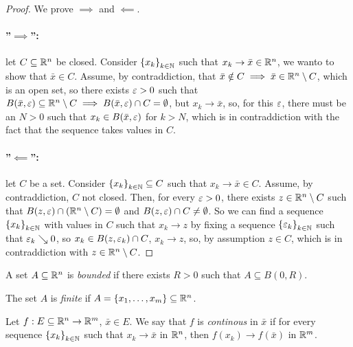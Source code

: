 \begin{proof}
    
    We prove $\implies$ and $\impliedby$.

    \paragraph{''$\implies$'':} let $C \subseteq {\mathbb{R}^n}$ be closed. Consider $\left\{ x_k \right\}_{k \in \mathbb{N}}$ such that $x_k \to \bar{x} \in {\mathbb{R}^n}$, we wanto to show that $\bar{x} \in C$. Assume, by contraddiction, that $\bar{x} \notin C \implies \bar{x} \in {\mathbb{R}^n} \setminus C$, which is an open set, so there exists $\varepsilon > 0$ such that $B(\bar{x},\varepsilon) \subseteq {\mathbb{R}^n}\setminus C \implies B(\bar{x},\varepsilon) \cap C = \emptyset$, but $x_k \to \bar{x}$, so, for this $\varepsilon$, there must be an $N > 0$ such that $x_k \in B(\bar{x},\varepsilon)$ for $k > N$, which is in contraddiction with the fact that the sequence takes values in $C$.

    \paragraph{''$\impliedby$'':} let $C$ be a set. Consider $\left\{ x_k \right\}_{k \in \mathbb{N}}\subseteq C$ such that $x_k \to \bar{x} \in C$. Assume, by contraddiction, $C$ not closed. Then, for every $\varepsilon > 0$, there exists $z \in {\mathbb{R}^n} \setminus C$ such that $B(z,\varepsilon) \cap ({\mathbb{R}^n} \setminus C) = \emptyset$ and $B(z,\varepsilon) \cap C \neq \emptyset$. So we can find a sequence $\left\{ x_k \right\}_{k \in \mathbb{N}}$ with values in $C$ such that $x_k \to z$ by fixing a sequence $\left\{ \varepsilon_k \right\}_{k \in \mathbb{N}}$ such that $\varepsilon_k \searrow 0$, so $x_k \in B(z,\varepsilon_k) \cap C$, $x_k \to z$, so, by assumption $z \in C$, which is in contraddiction with $z \in {\mathbb{R}^n} \setminus C$.

\end{proof}

\begin{definition}

    A set $A \subseteq {\mathbb{R}^n}$ is \emph{bounded} if there exists $R > 0$ such that $A \subseteq B(0,R)$.    

    The set $A$ is \emph{finite} if $A = \left\{ x_1,\dots,x_m \right\} \subseteq {\mathbb{R}^n}$.

\end{definition}

\begin{definition}[Continuity]

    Let $f : E \subseteq {\mathbb{R}^n} \to \mathbb{R}^m$, $\bar{x} \in E$. We say that $f$ is \emph{continous} in $\bar{x}$ if for every sequence $\left\{ x_k \right\}_{k \in \mathbb{N}}$ such that $x_k \to \bar{x}$ in ${\mathbb{R}^n}$, then $f(x_k) \to f(\bar{x})$ in $\mathbb{R}^m$.
    
\end{definition}

